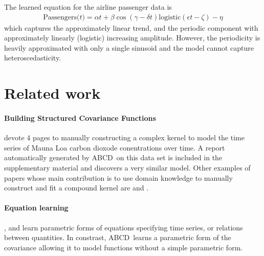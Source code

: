 \documentclass[letterpaper]{article}
\def\eg{e.g.\ }
\newcommand{\procedurename}{ABCD\ }
\begin{document}
The learned equation for the airline passenger data is
\begin{align*}
\textrm{Passengers($t$)} = \alpha t + \beta\cos(\gamma - \delta t)\textrm{logistic}(\epsilon t - \zeta) - \eta
\end{align*}
which captures the approximately linear trend, and the periodic component with approximately linearly (logistic) increasing amplitude.
However, the periodicity is heavily approximated with only a single sinusoid and the model cannot capture heteroscedasticity.





\section{Related work}

\paragraph{Building Structured Covariance Functions}
\cite{rasmussen38gaussian} devote 4 pages to manually constructing a complex kernel to model the time series of Mauna Loa carbon dioxode conentrations over time.
A report automatically generated by \procedurename on this data set is included in the supplementary material and discovers a very similar model. 
Other examples of papers whose main contribution is to use domain knowledge to manually construct and fit a compound \gp{} kernel are \cite{klenske2012nonparametric} and \cite{lloydgefcom2012}.

\paragraph{Equation learning}

\cite{schmidt2009distilling}, \cite{todorovski1997declarative} and \cite{washio1999discovering} learn parametric forms of equations specifying time series, or relations between quantities.
In constrast, \procedurename learns a parametric form of the covariance allowing it to model functions without a simple parametric form.
\end{document}
